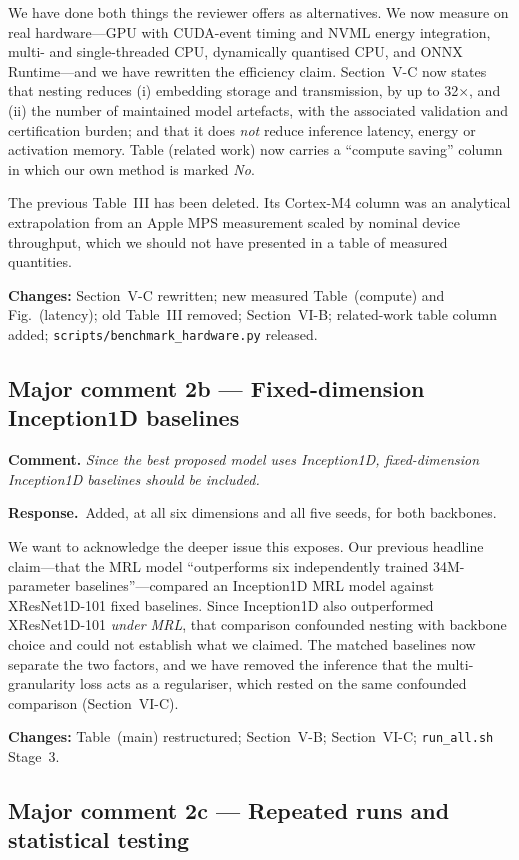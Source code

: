 \documentclass[11pt,a4paper]{article}
\newcommand{\comment}[1]{\par\medskip\noindent\textcolor{revblue}{\textbf{Comment.} \textit{#1}}\par\smallskip}
\newcommand{\response}{\par\noindent\textbf{Response.}\ }
\newcommand{\changed}[1]{\par\smallskip\noindent\textbf{Changes:} #1\par}
\begin{document}
We have done both things the reviewer offers as alternatives. We now measure
on real hardware---GPU with CUDA-event timing and NVML energy integration,
multi- and single-threaded CPU, dynamically quantised CPU, and ONNX
Runtime---and we have rewritten the efficiency claim. Section~V-C now states
that nesting reduces (i) embedding storage and transmission, by up to
32$\times$, and (ii) the number of maintained model artefacts, with the
associated validation and certification burden; and that it does \emph{not}
reduce inference latency, energy or activation memory. Table (related
work) now carries a ``compute saving'' column in which our own method is
marked \textit{No}.

The previous Table~III has been deleted. Its Cortex-M4 column was an
analytical extrapolation from an Apple MPS measurement scaled by nominal
device throughput, which we should not have presented in a table of measured
quantities.

\changed{Section~V-C rewritten; new measured Table~(compute) and
Fig.~(latency); old Table~III removed; Section~VI-B; related-work table
column added; \texttt{scripts/benchmark\_hardware.py} released.}

\subsection*{Major comment 2b --- Fixed-dimension Inception1D baselines}

\comment{Since the best proposed model uses Inception1D, fixed-dimension
Inception1D baselines should be included.}

\response Added, at all six dimensions and all five seeds, for both backbones.

We want to acknowledge the deeper issue this exposes. Our previous headline
claim---that the MRL model ``outperforms six independently trained
34M-parameter baselines''---compared an Inception1D MRL model against
XResNet1D-101 fixed baselines. Since Inception1D also outperformed
XResNet1D-101 \emph{under MRL}, that comparison confounded nesting with
backbone choice and could not establish what we claimed. The matched baselines
now separate the two factors, and we have removed the inference that the
multi-granularity loss acts as a regulariser, which rested on the same
confounded comparison (Section~VI-C).

\changed{Table~(main) restructured; Section~V-B; Section~VI-C;
\texttt{run\_all.sh} Stage~3.}

\subsection*{Major comment 2c --- Repeated runs and statistical testing}
\end{document}
